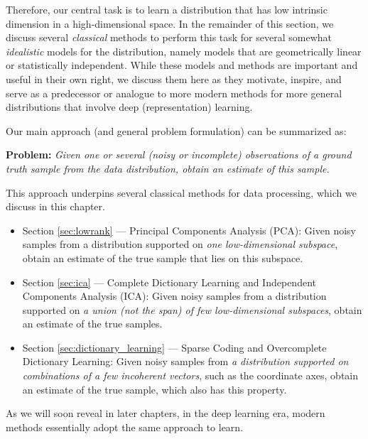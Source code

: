 \documentclass[\toplevelprefix/book-main.tex]{subfiles}
\begin{document}
Therefore, our central task is to learn a distribution that has low intrinsic dimension in a high-dimensional space. In the remainder of this section, we discuss several \textit{classical} methods to perform this task for several somewhat {\em idealistic} models for the distribution, namely models that are geometrically linear or statistically independent. While these models and methods are important and useful in their own right, we discuss them here as they motivate, inspire, and serve as a predecessor or analogue to more modern methods for more general distributions that involve deep (representation) learning.

Our main approach (and general problem formulation) can be summarized as:
\begin{tcolorbox}\centering
    \textbf{Problem:} \textit{Given one or several (noisy or incomplete) observations of a ground truth sample from the data distribution, obtain an estimate of this sample.}
\end{tcolorbox}
This approach underpins several classical methods for data processing, which we discuss in this chapter.
\begin{itemize}
    \item Section \ref{sec:lowrank} --- Principal Components Analysis (PCA): Given noisy samples from a distribution supported on {\em one low-dimensional subspace}, obtain an estimate of the true sample that lies on this subspace.
    \item  Section \ref{sec:ica} --- Complete Dictionary Learning and Independent Components Analysis (ICA): Given noisy samples from a distribution supported on {\em a union (\textit{not} the span) of few low-dimensional subspaces}, obtain an estimate of the true samples.
    \item Section \ref{sec:dictionary_learning} --- Sparse Coding and Overcomplete Dictionary Learning: Given noisy samples from {\em a distribution supported on combinations of a few incoherent vectors}, such as the coordinate axes, obtain an estimate of the true sample, which also has this property.
\end{itemize}
As we will soon reveal in later chapters, in the deep learning era, modern methods essentially adopt the same approach to learn.
\end{document}
